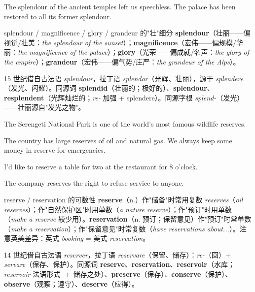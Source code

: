 \documentclass[../main.tex]{subfiles}
\begin{document}
{The splendour of the ancient temples left us speechless.}
{The palace has been restored to all its former splendour.}

\begin{lex}{splendour / magnificence / glory / grandeur 的"壮"细分}
\textbf{splendour}（壮丽——偏视觉/壮美：\textit{the splendour of the sunset}）；\textbf{magnificence}（宏伟——偏规模/华丽：\textit{the magnificence of the palace}）；\textbf{glory}（光荣——偏成就/名声：\textit{the glory of the empire}）；\textbf{grandeur}（宏伟——偏气势/庄严：\textit{the grandeur of the Alps}）。
\end{lex}

\begin{origin}
15 世纪借自古法语 \textit{splendour}，拉丁语 \textit{splendor}（光辉、壮丽），源于 \textit{splendere}（发光、闪耀）。同源词 \textbf{splendid}（壮丽的；极好的）、\textbf{splendour}、\textbf{resplendent}（光辉灿烂的；\textit{re-} 加强 + splendere）。同源字根 \textit{splend-}（发光）——壮丽源自"发光之物"。
\end{origin}


{The Serengeti National Park is one of the world's most famous wildlife reserves.}

{The country has large reserves of oil and natural gas.}
{We always keep some money in reserve for emergencies.}

{I'd like to reserve a table for two at the restaurant for 8 o'clock.}

{The company reserves the right to refuse service to anyone.}

\begin{gram}{reserve / reservation 的可数性}
\textbf{reserve}（n.）作"储备"时常用复数 \textit{reserves}（\textit{oil reserves}）；作"自然保护区"时用单数（\textit{a nature reserve}）；作"预订"时用单数（\textit{make a reserve} 较少用）。\textbf{reservation}（n. 预订；保留意见）作"预订"时常单数（\textit{make a reservation}）；作"保留意见"时常复数（\textit{have reservations about...}）。注意英美差异：英式 \textit{booking} = 美式 \textit{reservation}。
\end{gram}

\begin{origin}
14 世纪借自古法语 \textit{reserver}，拉丁语 \textit{reservare}（保留、储存）：\textit{re-}（回）+ \textit{servare}（保存、保护）。同源词 \textbf{reserve}、\textbf{reservation}、\textbf{reservoir}（水库；\textit{reservoir} 法语形式$\to$ 储存之处）、\textbf{preserve}（保存）、\textbf{conserve}（保护）、\textbf{observe}（观察；遵守）、\textbf{deserve}（应得）。
\end{origin}
\end{document}
